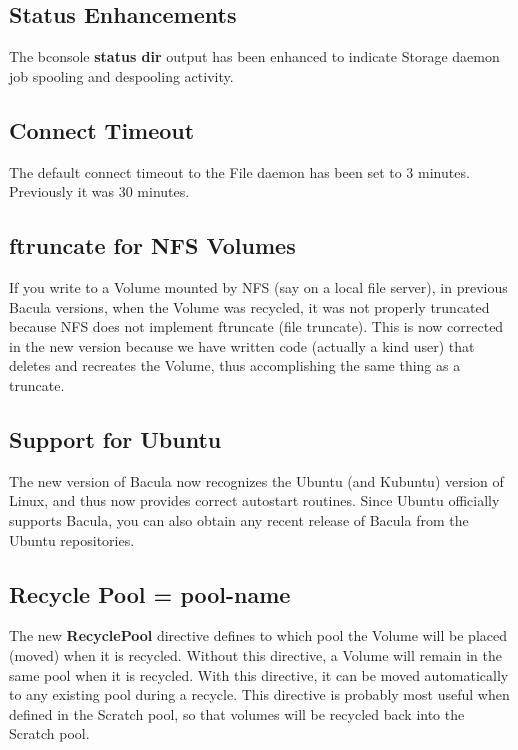 \subsection{Status Enhancements}
The bconsole {\bf status dir} output has been enhanced to indicate
Storage daemon job spooling and despooling activity.

\subsection{Connect Timeout}
The default connect timeout to the File
daemon has been set to 3 minutes. Previously it was 30 minutes.

\subsection{ftruncate for NFS Volumes}
If you write to a Volume mounted by NFS (say on a local file server),
in previous Bacula versions, when the Volume was recycled, it was not
properly truncated because NFS does not implement ftruncate (file 
truncate). This is now corrected in the new version because we have
written code (actually a kind user) that deletes and recreates the Volume,
thus accomplishing the same thing as a truncate.

\subsection{Support for Ubuntu}
The new version of Bacula now recognizes the Ubuntu (and Kubuntu)
version of Linux, and thus now provides correct autostart routines.
Since Ubuntu officially supports Bacula, you can also obtain any
recent release of Bacula from the Ubuntu repositories.

\subsection{Recycle Pool = \lt{}pool-name\gt{}}
The new \textbf{RecyclePool} directive defines to which pool the Volume will
be placed (moved) when it is recycled. Without this directive, a Volume will
remain in the same pool when it is recycled. With this directive, it can be
moved automatically to any existing pool during a recycle. This directive is
probably most useful when defined in the Scratch pool, so that volumes will
be recycled back into the Scratch pool.

